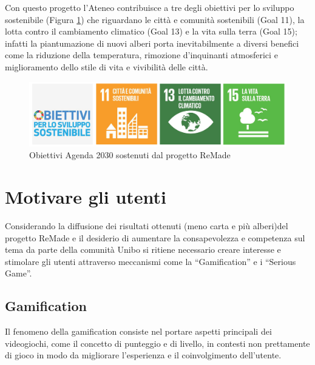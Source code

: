 Con questo progetto l'Ateneo contribuisce a tre degli obiettivi per lo sviluppo sostenibile (Figura \ref{fig:remade_dgs}) che riguardano le città e comunità sostenibili (Goal 11), la lotta contro il cambiamento climatico (Goal 13) e la vita sulla terra (Goal 15); infatti la piantumazione di nuovi alberi porta inevitabilmente a diversi benefici come la riduzione della temperatura, rimozione d'inquinanti atmosferici e miglioramento dello stile di vita e vivibilità delle città.
%
\begin{figure}
    \centering
    \includegraphics[width=\textwidth]{img/sdg_remade.png}
    \caption{Obiettivi Agenda 2030 sostenuti dal progetto ReMade}
    \label{fig:remade_dgs}
\end{figure}
%
\section{Motivare gli utenti}
Considerando la diffusione dei risultati ottenuti (meno carta e più alberi)del progetto ReMade e il desiderio di aumentare la consapevolezza e competenza sul tema da parte della comunità Unibo si ritiene necessario creare interesse e stimolare gli utenti attraverso meccanismi come la \enquote{Gamification} e i \enquote{Serious Game}.
%
\subsection{Gamification}


Il fenomeno della gamification consiste nel portare aspetti principali dei videogiochi, come il concetto di punteggio e di livello, in contesti non prettamente di gioco in modo da migliorare l'esperienza e il coinvolgimento dell'utente.

